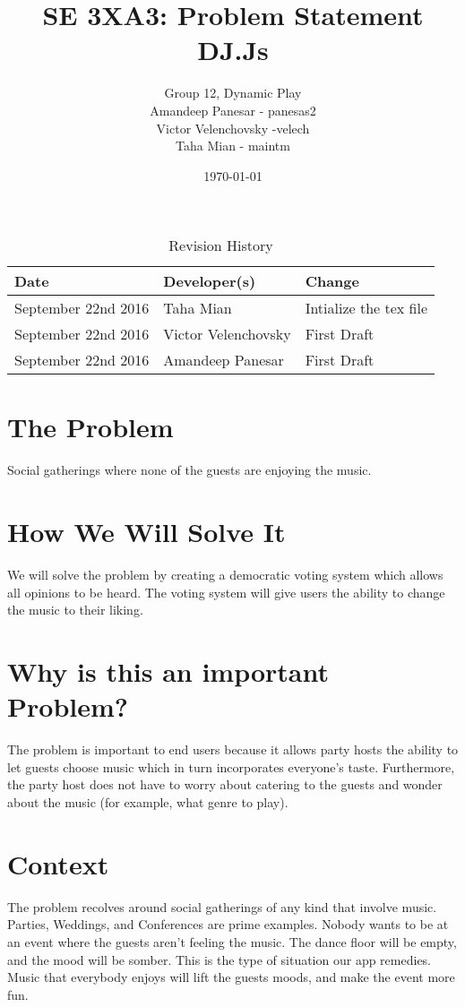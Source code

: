 \documentclass[11pt,fleqn]{article}
\title{SE 3XA3: Problem Statement\\DJ.Js}
\author{Group 12, Dynamic Play\\
Amandeep Panesar - panesas2 \\ Victor Velenchovsky -velech \\ Taha Mian - maintm}
\date{\today}
\begin{document}
\begin{table}[hp]
\caption{Revision History} \label{TblRevisionHistory}
\begin{tabularx}{\textwidth}{llX}
\toprule
\textbf{Date} & \textbf{Developer(s)} & \textbf{Change}\\
\midrule
September 22nd 2016 & Taha Mian & Intialize the tex file\\
September 22nd 2016 & Victor Velenchovsky & First Draft\\
September 22nd 2016 & Amandeep Panesar & First Draft\\
\bottomrule
\end{tabularx}
\end{table}
\maketitle

\section{The Problem}
Social gatherings where none of the guests are enjoying the music.
\section{How We Will Solve It}
We will solve the problem by creating a democratic voting system which allows
all opinions to be heard. The voting system will give users the ability to
change the music to their liking.

\section{Why is this an important Problem?}
The problem is important to end users because it allows party hosts the ability
to let guests choose music which in turn incorporates everyone's taste.
Furthermore, the party host does not have to worry about catering to the guests
and wonder about the music (for example, what genre to play).

\section{Context}
The problem recolves around social gatherings of any kind that involve music.
Parties, Weddings, and Conferences are prime examples. Nobody wants to be at an
event where the guests aren't feeling the music. The dance floor will be
empty, and the mood will be somber. This is the type of situation our app
remedies. Music that everybody enjoys will lift the guests moods, and make
the event more fun.
\end{document}
